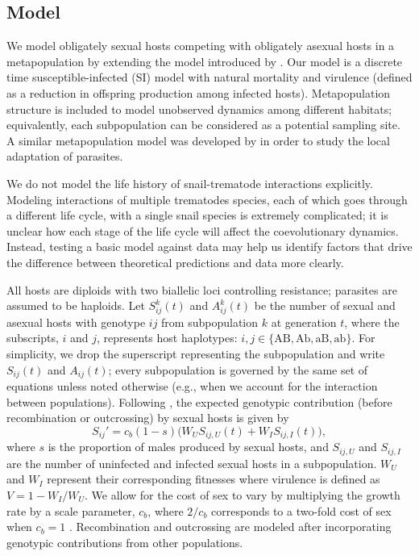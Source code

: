 \documentclass{article}\usepackage[]{graphicx}\usepackage[]{color}
\begin{document}
\subsection{Model}

We model obligately sexual hosts competing with obligately asexual hosts in a metapopulation by extending the model introduced by \cite{lively2010epidemiological}.
Our model is a discrete time susceptible-infected (SI) model with natural mortality and virulence (defined as a reduction in offspring production among infected hosts).
Metapopulation structure is included to model unobserved dynamics among different habitats; equivalently, each subpopulation can be considered as a potential sampling site.
A similar metapopulation model was developed by \cite{lively2018habitat} in order to study the local adaptation of parasites.

We do not model the life history of snail-trematode interactions explicitly.
Modeling interactions of multiple trematodes species, each of which goes 
through a different life cycle, with a single snail species is extremely complicated;
it is unclear how each stage of the life cycle will affect the coevolutionary dynamics.
Instead, testing a basic model against data may help us identify factors
that drive the difference between theoretical predictions and data more clearly.

All hosts are diploids with two biallelic loci controlling resistance; parasites are assumed to be haploids.
Let $S_{ij}^k(t)$ and $A_{ij}^k(t)$ be the number of sexual and asexual hosts with genotype $ij$ from subpopulation $k$ at generation $t$, 
where the subscripts, $i$ and $j$, represents host haplotypes: $i, j \in \{\mathrm{AB}, \mathrm{Ab}, \mathrm{aB}, \mathrm{ab}\}$.
For simplicity, we drop the superscript representing the subpopulation and write $S_{ij}(t)$ and $A_{ij}(t)$;
every subpopulation is governed by the same set of equations unless noted otherwise (e.g., when we account for the interaction between populations).
Following \cite{lively2010epidemiological}, the expected genotypic contribution (before recombination or outcrossing) by sexual hosts is given by
\begin{equation}
S_{ij}' = c_b (1-s) \bigg(W_U S_{ij,U} (t) + W_I S_{ij,I} (t)\bigg),
\end{equation}
where $s$ is the proportion of males produced by sexual hosts, and $S_{ij, U}$ and $S_{ij,I}$ are the number of uninfected and infected sexual hosts in a subpopulation.
$W_U$ and $W_I$ represent their corresponding fitnesses where virulence is defined as $V = 1-W_I/W_U$.
We allow for the cost of sex to vary by multiplying the growth rate by a scale parameter, $c_b$, where $2/c_b$ corresponds to a two-fold cost of sex when $c_b = 1$ \citep{ashby2015diversity}.
Recombination and outcrossing are modeled after incorporating genotypic contributions from other populations.
\end{document}
